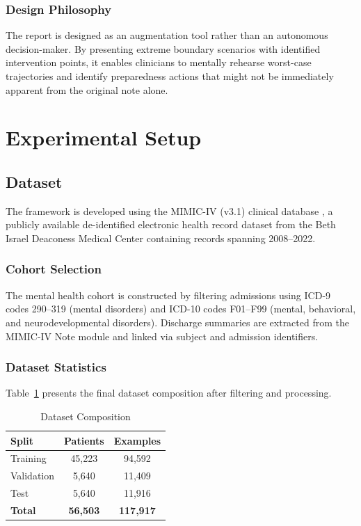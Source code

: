 \documentclass[conference]{IEEEtran}
\begin{document}
\subsubsection{Design Philosophy}
The report is designed as an augmentation tool rather than an autonomous decision-maker. By presenting extreme boundary scenarios with identified intervention points, it enables clinicians to mentally rehearse worst-case trajectories and identify preparedness actions that might not be immediately apparent from the original note alone.

\section{Experimental Setup}

\subsection{Dataset}

The framework is developed using the MIMIC-IV (v3.1) clinical database \cite{b14}, a publicly available de-identified electronic health record dataset from the Beth Israel Deaconess Medical Center containing records spanning 2008--2022.

\subsubsection{Cohort Selection}
The mental health cohort is constructed by filtering admissions using ICD-9 codes 290--319 (mental disorders) and ICD-10 codes F01--F99 (mental, behavioral, and neurodevelopmental disorders). Discharge summaries are extracted from the MIMIC-IV Note module and linked via subject and admission identifiers.

\subsubsection{Dataset Statistics}
Table~\ref{tab:dataset} presents the final dataset composition after filtering and processing.

\begin{table}[t]
\caption{Dataset Composition}
\label{tab:dataset}
\centering
\begin{tabular}{lcc}
\hline
\textbf{Split} & \textbf{Patients} & \textbf{Examples} \\
\hline
Training & 45,223 & 94,592 \\
Validation & 5,640 & 11,409 \\
Test & 5,640 & 11,916 \\
\hline
\textbf{Total} & \textbf{56,503} & \textbf{117,917} \\
\hline
\end{tabular}
\end{table}
\end{document}
